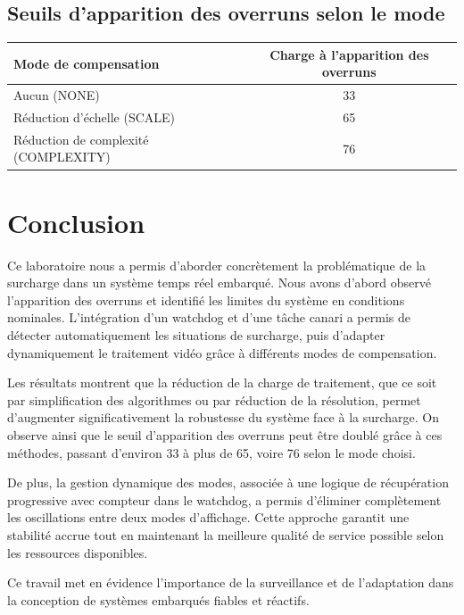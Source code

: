 \documentclass[a4paper,12pt]{article}
\begin{document}
\subsection{Seuils d'apparition des overruns selon le mode}

\begin{center}
\begin{tabular}{|l|c|}
\hline
\textbf{Mode de compensation} & \textbf{Charge à l'apparition des overruns} \\
\hline
Aucun (NONE) & 33 \\
Réduction d'échelle (SCALE) & 65 \\
Réduction de complexité (COMPLEXITY) & 76 \\
\hline
\end{tabular}
\end{center}

\newpage

\section{Conclusion}

Ce laboratoire nous a permis d'aborder concrètement la problématique de la surcharge dans un système temps réel embarqué. Nous avons d'abord observé l'apparition des overruns et identifié les limites du système en conditions nominales. L'intégration d'un watchdog et d'une tâche canari a permis de détecter automatiquement les situations de surcharge, puis d'adapter dynamiquement le traitement vidéo grâce à différents modes de compensation.

Les résultats montrent que la réduction de la charge de traitement, que ce soit par simplification des algorithmes ou par réduction de la résolution, permet d'augmenter significativement la robustesse du système face à la surcharge. On observe ainsi que le seuil d'apparition des overruns peut être doublé grâce à ces méthodes, passant d'environ 33 à plus de 65, voire 76 selon le mode choisi.

De plus, la gestion dynamique des modes, associée à une logique de récupération progressive avec compteur dans le watchdog, a permis d'éliminer complètement les oscillations entre deux modes d'affichage. Cette approche garantit une stabilité accrue tout en maintenant la meilleure qualité de service possible selon les ressources disponibles.

Ce travail met en évidence l'importance de la surveillance et de l'adaptation dans la conception de systèmes embarqués fiables et réactifs.
\end{document}
